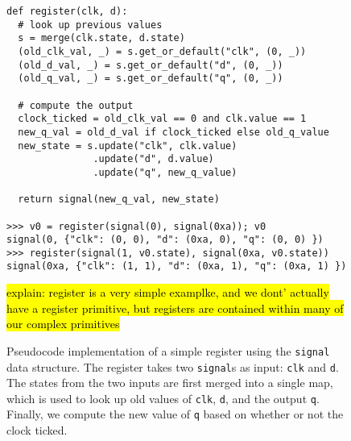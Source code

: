 \begin{figure}
\begin{verbatim}
def register(clk, d):
  # look up previous values
  s = merge(clk.state, d.state)
  (old_clk_val, _) = s.get_or_default("clk", (0, _))
  (old_d_val, _) = s.get_or_default("d", (0, _))
  (old_q_val, _) = s.get_or_default("q", (0, _))

  # compute the output
  clock_ticked = old_clk_val == 0 and clk.value == 1
  new_q_val = old_d_val if clock_ticked else old_q_value
  new_state = s.update("clk", clk.value)
               .update("d", d.value)
               .update("q", new_q_value)
  
  return signal(new_q_val, new_state)

>>> v0 = register(signal(0), signal(0xa)); v0
signal(0, {"clk": (0, 0), "d": (0xa, 0), "q": (0, 0) })
>>> register(signal(1, v0.state), signal(0xa, v0.state))
signal(0xa, {"clk": (1, 1), "d": (0xa, 1), "q": (0xa, 1) })
\end{verbatim}
    \caption{
Pseudocode implementation 
  of a simple register 
  using the \texttt{signal} data structure.
The register takes two \texttt{signal}s as input:
  \texttt{clk} and \texttt{d}.
The states from the two inputs are first merged
  into a single map,
  which is used to look up old values of
  \texttt{clk}, \texttt{d},
  and the output \texttt{q}.
Finally, we compute
  the new value of \texttt{q}
  based on whether or not
  the clock ticked.
}
    \label{fig:signal-example}
\hl{explain: register is a very simple examplke, and we dont' actually have a register primitive, but registers are contained within many of our complex primitives}
\end{figure}